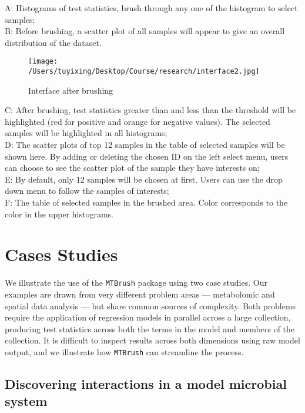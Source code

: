 \documentclass[
]{article}
\begin{document}
A: Histograms of test statistics, brush through any one of the histogram
to select samples;\\
B: Before brushing, a scatter plot of all samples will appear to give an
overall distribution of the dataset.

\begin{figure}
\centering
\texttt{[image: /Users/tuyixing/Desktop/Course/research/interface2.jpg]}
\caption{Interface after brushing}
\end{figure}

C: After brushing, test statistics greater than and less than the
threshold will be highlighted (red for positive and orange for negative
values). The selected samples will be highlighted in all histograms;\\
D: The scatter plots of top 12 samples in the table of selected samples
will be shown here. By adding or deleting the chosen ID on the left
select menu, users can choose to see the scatter plot of the sample they
have interests on;\\
E: By default, only 12 samples will be chosen at first. Users can use
the drop down menu to follow the samples of interests;\\
F: The table of selected samples in the brushed area. Color corresponds
to the color in the upper histograms.

\hypertarget{cases-studies}{%
\section{Cases Studies}\label{cases-studies}}

We illustrate the use of the \texttt{MTBrush} package using two case
studies. Our examples are drawn from very different problem areas ---
metabolomic and spatial data analysis --- but share common sources of
complexity. Both problems require the application of regression models
in parallel across a large collection, producing test statistics across
both the terms in the model and members of the collection. It is
difficult to inspect results across both dimensions using raw model
output, and we illustrate how \texttt{MTBrush} can streamline the
process.

\hypertarget{discovering-interactions-in-a-model-microbial-system}{%
\subsection{Discovering interactions in a model microbial
system}\label{discovering-interactions-in-a-model-microbial-system}}
\end{document}
